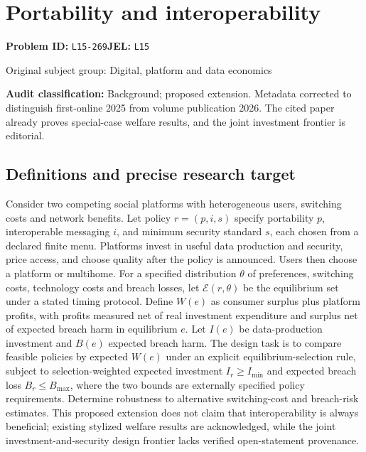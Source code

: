 \documentclass[11pt,a4paper]{article}
\begin{document}
\section*{Portability and interoperability}
\textbf{Problem ID:} \texttt{L15-269}\quad \textbf{JEL:} \texttt{L15}\par
\label{problem:OP-0409}
{\sffamily\small\color{muted}Original subject group: Digital, platform and data economics\par}
\label{definitions:problem:30007691}
\textbf{Audit classification:} Background; proposed extension. Metadata corrected to distinguish first-online 2025 from volume publication 2026. The cited paper already proves special-case welfare results, and the joint investment frontier is editorial.
\subsection*{Definitions and precise research target}
Consider two competing social platforms with heterogeneous users, switching costs and network benefits. Let policy \(r=(p,i,s)\) specify portability \(p\), interoperable messaging \(i\), and minimum security standard \(s\), each chosen from a declared finite menu. Platforms invest in useful data production and security, price access, and choose quality after the policy is announced. Users then choose a platform or multihome. For a specified distribution \(\theta\) of preferences, switching costs, technology costs and breach losses, let \(\mathcal E(r,\theta)\) be the equilibrium set under a stated timing protocol. Define \(W(e)\) as consumer surplus plus platform profits, with profits measured net of real investment expenditure and surplus net of expected breach harm in equilibrium \(e\). Let \(I(e)\) be data-production investment and \(B(e)\) expected breach harm. The design task is to compare feasible policies by expected \(W(e)\) under an explicit equilibrium-selection rule, subject to selection-weighted expected investment \(I_r\geq I_{\min}\) and expected breach loss \(B_r\leq B_{\max}\), where the two bounds are externally specified policy requirements. Determine robustness to alternative switching-cost and breach-risk estimates. This proposed extension does not claim that interoperability is always beneficial; existing stylized welfare results are acknowledged, while the joint investment-and-security design frontier lacks verified open-statement provenance.
\end{document}
